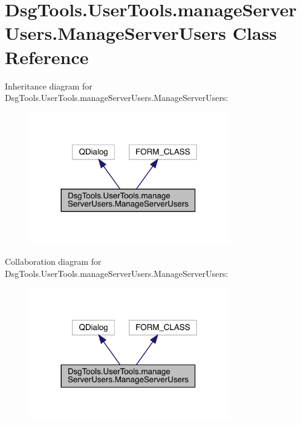 \hypertarget{class_dsg_tools_1_1_user_tools_1_1manage_server_users_1_1_manage_server_users}{}\section{Dsg\+Tools.\+User\+Tools.\+manage\+Server\+Users.\+Manage\+Server\+Users Class Reference}
\label{class_dsg_tools_1_1_user_tools_1_1manage_server_users_1_1_manage_server_users}


Inheritance diagram for Dsg\+Tools.\+User\+Tools.\+manage\+Server\+Users.\+Manage\+Server\+Users\+:
\nopagebreak
\begin{figure}[H]
\begin{center}
\leavevmode
\includegraphics[width=248pt]{class_dsg_tools_1_1_user_tools_1_1manage_server_users_1_1_manage_server_users__inherit__graph}
\end{center}
\end{figure}


Collaboration diagram for Dsg\+Tools.\+User\+Tools.\+manage\+Server\+Users.\+Manage\+Server\+Users\+:
\nopagebreak
\begin{figure}[H]
\begin{center}
\leavevmode
\includegraphics[width=248pt]{class_dsg_tools_1_1_user_tools_1_1manage_server_users_1_1_manage_server_users__coll__graph}
\end{center}
\end{figure}
